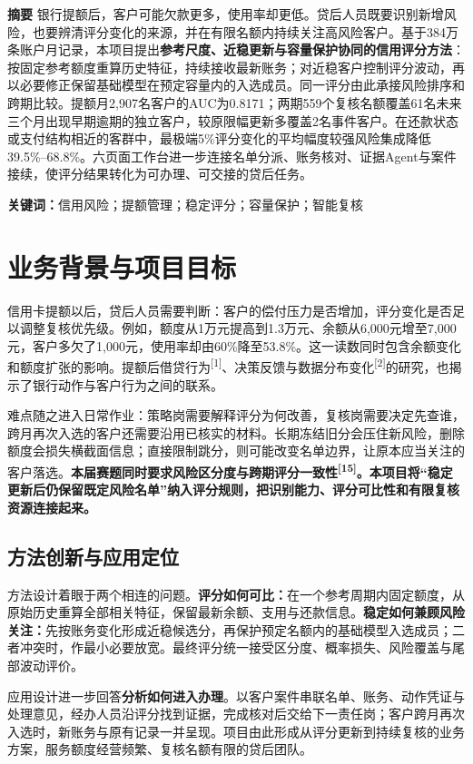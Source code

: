 \noindent\textbf{摘要}\quad
银行提额后，客户可能欠款更多，使用率却更低。贷后人员既要识别新增风险，也要辨清评分变化的来源，并在有限名额内持续关注高风险客户。基于384万条账户月记录，本项目提出\textbf{参考尺度、近稳更新与容量保护协同的信用评分方法}：按固定参考额度重算历史特征，持续接收最新账务；对近稳客户控制评分波动，再以必要修正保留基础模型在预定容量内的入选成员。同一评分由此承接风险排序和跨期比较。提额月2,907名客户的AUC为0.8171；两期559个复核名额覆盖61名未来三个月出现早期逾期的独立客户，较原限幅更新多覆盖2名事件客户。在还款状态或支付结构相近的客群中，最极端5\%评分变化的平均幅度较强风险集成降低39.5\%--68.8\%。六页面工作台进一步连接名单分派、账务核对、证据Agent与案件接续，使评分结果转化为可办理、可交接的贷后任务。

\par\noindent\textbf{关键词：}信用风险；提额管理；稳定评分；容量保护；智能复核

\section{业务背景与项目目标}
信用卡提额以后，贷后人员需要判断：客户的偿付压力是否增加，评分变化是否足以调整复核优先级。例如，额度从1万元提高到1.3万元、余额从6,000元增至7,000元，客户多欠了1,000元，使用率却由60\%降至53.8\%。这一读数同时包含余额变化和额度扩张的影响。提额后借贷行为\textsuperscript{[1]}、决策反馈与数据分布变化\textsuperscript{[2]}的研究，也揭示了银行动作与客户行为之间的联系。

难点随之进入日常作业：策略岗需要解释评分为何改善，复核岗需要决定先查谁，跨月再次入选的客户还需要沿用已核实的材料。长期冻结旧分会压住新风险，删除额度会损失横截面信息；直接限制跳分，则可能改变名单边界，让原本应当关注的客户落选。\textbf{本届赛题同时要求风险区分度与跨期评分一致性\textsuperscript{[15]}。本项目将“稳定更新后仍保留既定风险名单”纳入评分规则，把识别能力、评分可比性和有限复核资源连接起来。}

\subsection{方法创新与应用定位}
方法设计着眼于两个相连的问题。\textbf{评分如何可比：}在一个参考周期内固定额度，从原始历史重算全部相关特征，保留最新余额、支用与还款信息。\textbf{稳定如何兼顾风险关注：}先按账务变化形成近稳候选分，再保护预定名额内的基础模型入选成员；二者冲突时，作最小必要放宽。最终评分统一接受区分度、概率损失、风险覆盖与尾部波动评价。

应用设计进一步回答\textbf{分析如何进入办理}。以客户案件串联名单、账务、动作凭证与处理意见，经办人员沿评分找到证据，完成核对后交给下一责任岗；客户跨月再次入选时，新账务与原有记录一并呈现。项目由此形成从评分更新到持续复核的业务方案，服务额度经营频繁、复核名额有限的贷后团队。

